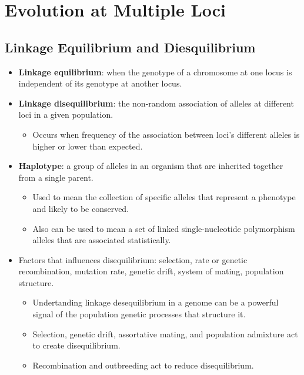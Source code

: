\documentclass[12pt,a4paper]{article}
\begin{document}
\clearpage
\setcounter{section}{7}
\section{Evolution at Multiple Loci}
\subsection{Linkage Equilibrium and Diesquilibrium}
\begin{itemize}
    \item \textbf{Linkage equilibrium}: when the genotype of a chromosome at one locus is {\color{o-Sun}independent} of its genotype at another locus.
    \item \textbf{Linkage disequilibrium}: the non-random association of alleles at different loci in a given population. 
        \begin{itemize}
            \item Occurs when frequency of the association between loci's different alleles is higher or lower than expected.
        \end{itemize}
    \item \textbf{Haplotype}: a group of alleles in an organism that are inherited together from a single parent.
        \begin{itemize}
            \item Used to mean the collection of specific alleles that represent a phenotype and likely to be conserved.
            \item Also can be used to mean a set of linked single-nucleotide polymorphism alleles that are associated statistically.
        \end{itemize}
    \item Factors that influences disequilibrium: selection, rate or genetic recombination, mutation rate, genetic drift, system of mating, population structure.
        \begin{itemize}
            \item Undertanding linkage desequilibrium in a genome can be a powerful signal of the population genetic processes that structure it.
            \item Selection, genetic drift, assortative mating, and population admixture act to {\color{pos}create disequilibrium}. 
            \item Recombination and outbreeding act to {\color{neg}reduce disequilibrium}.

\end{itemize}
\end{itemize}
\end{document}
